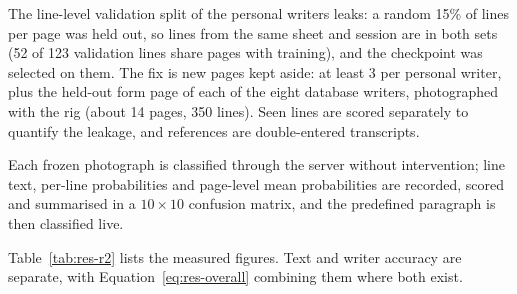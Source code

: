 
            The line-level validation split of the personal writers leaks: a random 15\% of lines per page was held out, so lines from the same sheet and session are in both sets (52 of 123 validation lines share pages with training), and the checkpoint was selected on them.
            The fix is new pages kept aside: at least 3 per personal writer, plus the held-out form page of each of the eight database writers, photographed with the rig (about 14 pages, 350 lines). Seen lines are scored separately to quantify the leakage, and references are double-entered transcripts.


            Each frozen photograph is classified through the server without intervention; line text, per-line probabilities and page-level mean probabilities are recorded, scored and summarised in a $10\times10$ confusion matrix, and the predefined paragraph is then classified live.


            Table~\ref{tab:res-r2} lists the measured figures. Text and writer accuracy are separate, with Equation~\ref{eq:res-overall} combining them where both exist.

